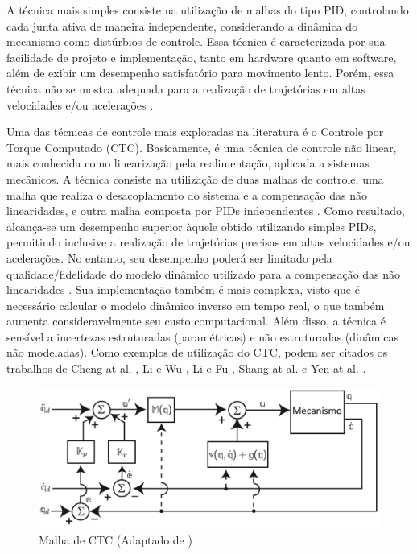 \documentclass[]{politex}
\begin{document}
A técnica mais simples consiste na utilização de malhas do tipo PID, controlando cada junta ativa de maneira independente, considerando a dinâmica do mecanismo como distúrbios de controle. Essa técnica é caracterizada por sua facilidade de projeto e implementação, tanto em hardware quanto em software, além de exibir um desempenho satisfatório para movimento lento. Porém, essa técnica não se mostra adequada para a realização de trajetórias em altas velocidades e/ou acelerações \cite{Honegger, Zubizarreta}.

Uma das técnicas de controle mais exploradas na literatura é o Controle por Torque Computado (CTC). Basicamente, é uma técnica de controle não linear, mais conhecida como linearização pela realimentação, aplicada a sistemas mecânicos. A técnica consiste na utilização de duas malhas de controle, uma malha que realiza o desacoplamento do sistema e a compensação das não linearidades, e outra malha composta por PIDs independentes \cite{Craig}. Como resultado, alcança-se um desempenho  superior  àquele obtido utilizando simples PIDs, permitindo inclusive a realização de trajetórias precisas em altas velocidades e/ou acelerações. No entanto, seu desempenho poderá ser limitado pela qualidade/fidelidade do modelo dinâmico utilizado para a compensação das não linearidades \cite{SlotiniSMC}. Sua implementação também é mais complexa, visto que é necessário calcular o modelo dinâmico inverso em tempo real, o que também aumenta consideravelmente seu custo computacional. Além disso, a técnica é sensível a incertezas estruturadas (paramétricas) e não estruturadas (dinâmicas não modeladas). Como exemplos de utilização do CTC, podem ser citados os trabalhos de Cheng at al. \cite{Cheng}, Li e Wu \cite{Li}, Li e Fu \cite{Li2}, Shang at al. \cite{Shang} e Yen at al. \cite{Yen}.

\begin{figure}[h]
	\centering
	\includegraphics[scale=0.385]{../figures/CTC.jpg}  
	\caption{Malha de CTC (Adaptado de \cite{Craig})}
	\label{fig:CTC}
\end{figure}
\end{document}
